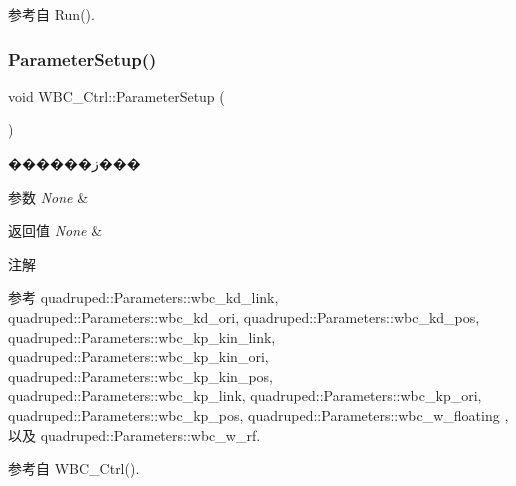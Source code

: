 参考自 Run().

\mbox{\label{classquadruped_1_1WBC__Ctrl_a0e0f118c16781a623a77286d20b5ced0}} 
\subsubsection{\texorpdfstring{Parameter\+Setup()}{ParameterSetup()}}
{\footnotesize\ttfamily void W\+B\+C\+\_\+\+Ctrl\+::\+Parameter\+Setup (\begin{DoxyParamCaption}\item[{void}]{ }\end{DoxyParamCaption})}



������ز��� 


\begin{DoxyParams}{参数}
{\em None} & \\
\hline
\end{DoxyParams}

\begin{DoxyRetVals}{返回值}
{\em None} & \\
\hline
\end{DoxyRetVals}
\begin{DoxyNote}{注解}

\end{DoxyNote}


参考 quadruped\+::\+Parameters\+::wbc\+\_\+kd\+\_\+link, quadruped\+::\+Parameters\+::wbc\+\_\+kd\+\_\+ori, quadruped\+::\+Parameters\+::wbc\+\_\+kd\+\_\+pos, quadruped\+::\+Parameters\+::wbc\+\_\+kp\+\_\+kin\+\_\+link, quadruped\+::\+Parameters\+::wbc\+\_\+kp\+\_\+kin\+\_\+ori, quadruped\+::\+Parameters\+::wbc\+\_\+kp\+\_\+kin\+\_\+pos, quadruped\+::\+Parameters\+::wbc\+\_\+kp\+\_\+link, quadruped\+::\+Parameters\+::wbc\+\_\+kp\+\_\+ori, quadruped\+::\+Parameters\+::wbc\+\_\+kp\+\_\+pos, quadruped\+::\+Parameters\+::wbc\+\_\+w\+\_\+floating , 以及 quadruped\+::\+Parameters\+::wbc\+\_\+w\+\_\+rf.



参考自 W\+B\+C\+\_\+\+Ctrl().

\mbox{\label{classquadruped_1_1WBC__Ctrl_ab27e13c54c86f5115e6807e18fd6d144}} 
